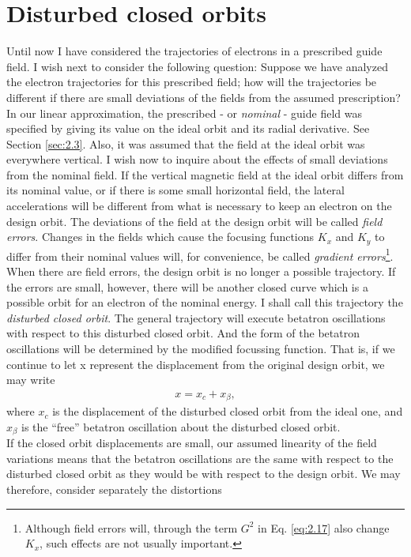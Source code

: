 \section{Disturbed closed orbits}\label{sec:2.10}

Until now I have considered the trajectories of electrons in a prescribed guide field. I wish next to consider the following question: Suppose we have analyzed the electron trajectories for this prescribed field; how will the trajectories be different if there are small deviations of the fields from the assumed prescription? In our linear approximation, the prescribed - or \emph{nominal} - guide field was specified by giving its value on the ideal orbit and its radial derivative. See Section \ref{sec:2.3}. Also, it was assumed that the field at the ideal orbit was everywhere vertical. I wish now to inquire about the effects of small deviations from the nominal field. If the vertical magnetic field at the ideal orbit differs
 from its nominal value, or if there is some small horizontal field, the lateral accelerations
will be different from what is necessary to keep an electron on the design orbit. The deviations
 of the field at the design orbit will be called \emph{field errors}. Changes in the fields which cause the focusing functions $K_x$ and $K_y$ to differ from their nominal values will, for convenience, be called \emph{gradient errors}\footnote{Although field errors will, through the term $G^2$ in Eq. \eqref{eq:2.17} also change $K_x$, such effects are not usually important.}.\\
When there are field errors, the design orbit is no longer a possible trajectory. If the errors
 are small, however, there will be another closed curve which is a possible orbit for an electron
 of the nominal energy. I shall call this trajectory the \emph{disturbed closed orbit}. The general trajectory will execute betatron oscillations with respect to this disturbed closed orbit. And the form of the betatron oscillations will be determined by the modified focussing function. That is, if we continue to let x represent the displacement from the original design orbit, we may write
\begin{align}\label{eq:2.83}
	x = x_c + x_\beta,
\end{align}
where $x_c$ is the displacement of the disturbed closed orbit from the ideal one, and $x_\beta$ is the “free” betatron oscillation about the disturbed closed orbit.\\
If the closed orbit displacements are small, our assumed linearity of the field variations means that the betatron oscillations are the same with respect to the disturbed closed orbit as they would be with respect to the design orbit. We may therefore, consider separately the distortions
